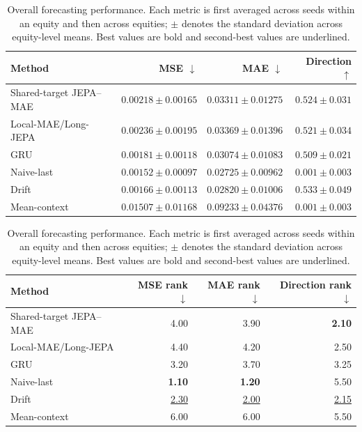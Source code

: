 \begin{table}[t]
\centering
\small
\caption{Overall forecasting performance. Each metric is first averaged across seeds within an equity and then across equities; $\pm$ denotes the standard deviation across equity-level means. Best values are bold and second-best values are underlined.}
\label{tab:main_metrics}
\begin{tabular}{lrrr}
\toprule
Method & MSE $\downarrow$ & MAE $\downarrow$ & Direction $\uparrow$ \\
\midrule
Shared-target JEPA--MAE & $0.00218 \pm 0.00165$ & $0.03311 \pm 0.01275$ & \underline{$0.524 \pm 0.031$} \\
Local-MAE/Long-JEPA & $0.00236 \pm 0.00195$ & $0.03369 \pm 0.01396$ & $0.521 \pm 0.034$ \\
GRU & $0.00181 \pm 0.00118$ & $0.03074 \pm 0.01083$ & $0.509 \pm 0.021$ \\
Naive-last & \textbf{$0.00152 \pm 0.00097$} & \textbf{$0.02725 \pm 0.00962$} & $0.001 \pm 0.003$ \\
Drift & \underline{$0.00166 \pm 0.00113$} & \underline{$0.02820 \pm 0.01006$} & \textbf{$0.533 \pm 0.049$} \\
Mean-context & $0.01507 \pm 0.01168$ & $0.09233 \pm 0.04376$ & $0.001 \pm 0.003$ \\
\bottomrule
\end{tabular}
\par\medskip
\begin{tabular}{lrrr}
\toprule
Method & MSE rank $\downarrow$ & MAE rank $\downarrow$ & Direction rank $\downarrow$ \\
\midrule
Shared-target JEPA--MAE & 4.00 & 3.90 & \textbf{2.10} \\
Local-MAE/Long-JEPA & 4.40 & 4.20 & 2.50 \\
GRU & 3.20 & 3.70 & 3.25 \\
Naive-last & \textbf{1.10} & \textbf{1.20} & 5.50 \\
Drift & \underline{2.30} & \underline{2.00} & \underline{2.15} \\
Mean-context & 6.00 & 6.00 & 5.50 \\
\bottomrule
\end{tabular}
\end{table}
